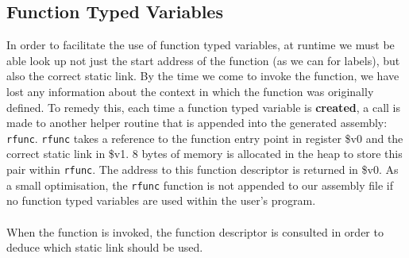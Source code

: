 \subsection{Function Typed Variables}
\label{sec:ftv}
In order to facilitate the use of function typed variables, at runtime we must be able look up not just the start address of the function (as we can for labels), but also the correct static link. By the time we come to invoke the function, we have lost any information about the context in which the function was originally defined. To remedy this, each time a function typed variable is \textbf{created}, a call is made to another helper routine that is appended into the generated assembly: \verb!rfunc!. \verb!rfunc! takes a reference to the function entry point in register \$v0 and the correct static link in \$v1. 8 bytes of memory is allocated in the heap to store this pair within \verb!rfunc!. The address to this function descriptor is returned in \$v0. As a small optimisation, the \verb!rfunc! function is not appended to our assembly file if no function typed variables are used within the user's program.
\ \\ \ \\
When the function is invoked, the function descriptor is consulted in order to deduce which static link should be used.

